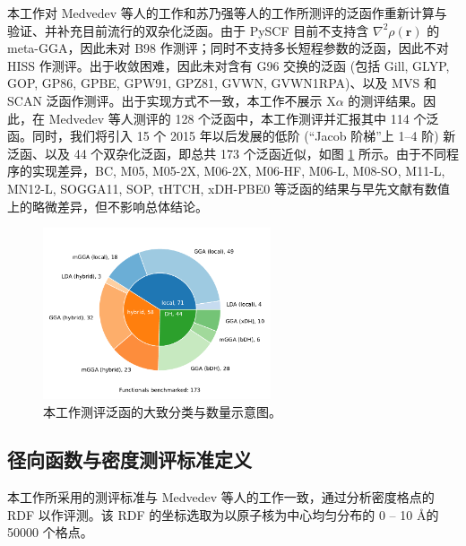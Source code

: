 本工作对 Medvedev 等人的工作\cite{Medvedev-Lyssenko.S.2017}和苏乃强等人的工作\cite{Su-Xu.PNAS.2018}所测评的泛函作重新计算与验证、并补充目前流行的双杂化泛函。由于 PySCF 目前不支持含 $\nabla^2 \rho(\bm{r})$ 的 meta-GGA，因此未对 B98 作测评；同时不支持多长短程参数的泛函，因此不对 HISS 作测评。出于收敛困难，因此未对含有 G96 交换的泛函 (包括 Gill, GLYP, GOP, GP86, GPBE, GPW91, GPZ81, GVWN, GVWN1RPA)、以及 MVS 和 SCAN 泛函作测评。出于实现方式不一致，本工作不展示 X$\alpha$ 的测评结果。因此，在 Medvedev 等人测评的 128 个泛函中，本工作测评并汇报其中 114 个泛函。同时，我们将引入 15 个 2015 年以后发展的低阶 (“Jacob 阶梯”上 1--4 阶) 新泛函、以及 44 个双杂化泛函，即总共 173 个泛函近似，如图 \ref{fig.4.functionals-distribution} 所示。由于不同程序的实现差异，BC, M05, M05-2X, M06-2X, M06-HF, M06-L, M08-SO, M11-L, MN12-L, SOGGA11, SOP, τHTCH, xDH-PBE0 等泛函的结果与早先文献有数值上的略微差异，但不影响总体结论。

\begin{figure}[hp]
    \centering
    \includegraphics[width=0.6\textwidth]{assets/functionals-distribution.pdf}
    \caption{本工作测评泛函的大致分类与数量示意图。}
    \label{fig.4.functionals-distribution}
\end{figure}

\subsection{径向函数与密度测评标准定义}

本工作所采用的测评标准与 Medvedev 等人的工作\cite{Medvedev-Lyssenko.S.2017}一致，通过分析密度格点的 RDF 以作评测。该 RDF 的坐标选取为以原子核为中心均匀分布的 0 -- 10 \AA 的 50000 个格点。

